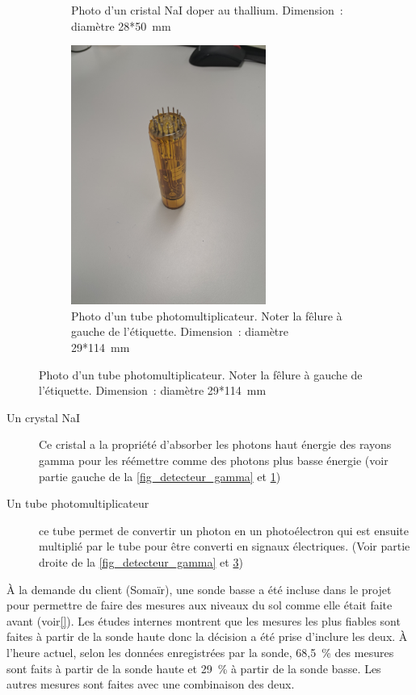 \begin{figure}
\begin{subfigure}{0.45\textwidth}
        \caption[Photo d'un cristal NaI]{Photo d'un cristal NaI doper au thallium. Dimension~: diamètre 28*50~mm}
        \label{fig_Nai}
    \end{subfigure}
    \begin{subfigure}{0.45\textwidth}
        \centering
        \includegraphics[width=0.7\textwidth]{img/photo/PMT.jpg}
        \caption[Photo d'un tube photomultiplicateur]{Photo d'un tube photomultiplicateur. Noter la fêlure à gauche de l'étiquette. Dimension~: diamètre 29*114~mm}
        \label{fig_PMT}
    \end{subfigure}
\end{figure}
\begin{description}
    \item[Un crystal NaI] Ce cristal a la propriété d'absorber les photons haut énergie des rayons gamma pour les réémettre comme des photons plus basse énergie (voir partie gauche de la \cref{fig_detecteur_gamma} et \cref{fig_Nai})~\cite{site:explication_NaI}
    \item[Un tube photomultiplicateur]ce tube permet de convertir un photon en un photoélectron qui est ensuite multiplié par le tube pour être converti en signaux électriques. (Voir partie droite de la \cref{fig_detecteur_gamma} et \cref{fig_PMT})~\cite{site:explication_NaI}
\end{description}
À la demande du client (Somaïr), une sonde basse a été incluse dans le projet pour permettre de faire des mesures aux niveaux du sol comme elle était faite avant (voir\ref{}). %
Les études internes montrent que les mesures les plus fiables sont faites à partir de la sonde haute donc la décision a été prise d'inclure les deux. À l'heure actuel, selon les données enregistrées par la sonde, 68,5~\% des mesures sont faits à partir de la sonde haute et 29~\% à partir de la sonde basse. Les autres mesures sont faites avec une combinaison des deux.

